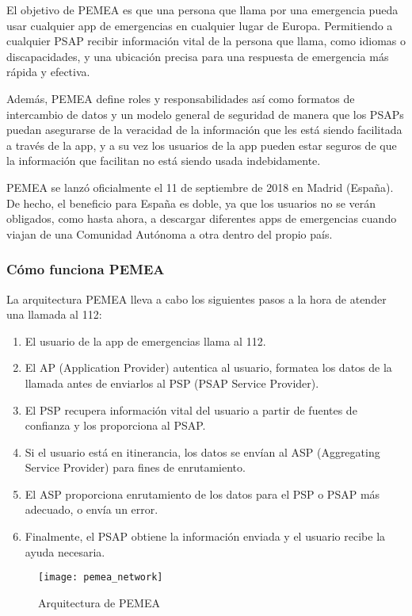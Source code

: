 El objetivo de PEMEA es que una persona que llama por una emergencia pueda usar cualquier app de emergencias en cualquier lugar de Europa. Permitiendo a cualquier PSAP recibir información vital de la persona que llama, como idiomas o discapacidades, y una ubicación precisa para una respuesta de emergencia más rápida y efectiva.

Además, PEMEA define roles y responsabilidades así como formatos de intercambio de datos y un modelo general de seguridad de manera que los PSAPs puedan asegurarse de la veracidad de la información que les está siendo facilitada a través de la app, y a su vez los usuarios de la app pueden estar seguros de que la información que facilitan no está siendo usada indebidamente.

PEMEA se lanzó oficialmente el 11 de septiembre de 2018 en Madrid (España). De hecho, el beneficio para España es doble, ya que los usuarios no se verán obligados, como hasta ahora, a descargar diferentes apps de emergencias cuando viajan de una Comunidad Autónoma a otra dentro del propio país.

\subsubsection{Cómo funciona PEMEA}

La arquitectura PEMEA lleva a cabo los siguientes pasos a la hora de atender una llamada al 112:

\begin{enumerate}
  \item El usuario de la app de emergencias llama al 112.
  \item El AP (Application Provider) autentica al usuario, formatea los datos de la llamada antes de enviarlos al PSP (PSAP Service Provider).
  \item El PSP recupera información vital del usuario a partir de fuentes de confianza y los proporciona al PSAP.
  \item Si el usuario está en itinerancia, los datos se envían al ASP (Aggregating Service Provider) para fines de enrutamiento.
  \item El ASP proporciona enrutamiento de los datos para el PSP o PSAP más adecuado, o envía un error.
  \item Finalmente, el PSAP obtiene la información enviada y el usuario recibe la ayuda necesaria.
\end{enumerate}

\begin{figure}[htp!]
  \centering
  \texttt{[image: pemea\_network]}
  \caption{Arquitectura de PEMEA}
  \label{fig:pemea_network}
\end{figure}

